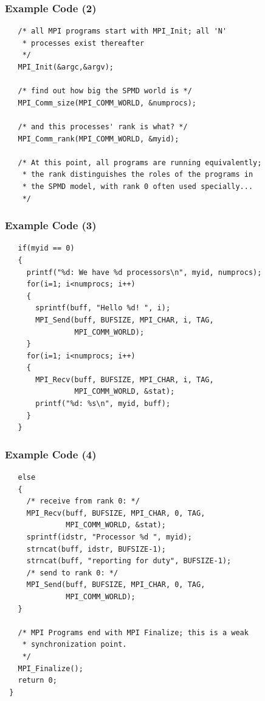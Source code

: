 \begin{frame}[fragile]
  \frametitle{Example Code (2)}
  

  \begin{lstlisting}
   /* all MPI programs start with MPI_Init; all 'N'
    * processes exist thereafter
    */
   MPI_Init(&argc,&argv); 

   /* find out how big the SPMD world is */
   MPI_Comm_size(MPI_COMM_WORLD, &numprocs);

   /* and this processes' rank is what? */
   MPI_Comm_rank(MPI_COMM_WORLD, &myid);
 
   /* At this point, all programs are running equivalently;
    * the rank distinguishes the roles of the programs in
    * the SPMD model, with rank 0 often used specially...
    */
  \end{lstlisting}
  
\end{frame}

\begin{frame}[fragile]
  \frametitle{Example Code (3)}
  

  \begin{lstlisting}
   if(myid == 0)
   {
     printf("%d: We have %d processors\n", myid, numprocs);
     for(i=1; i<numprocs; i++)
     {
       sprintf(buff, "Hello %d! ", i);
       MPI_Send(buff, BUFSIZE, MPI_CHAR, i, TAG,
                MPI_COMM_WORLD);
     }
     for(i=1; i<numprocs; i++)
     {
       MPI_Recv(buff, BUFSIZE, MPI_CHAR, i, TAG,
                MPI_COMM_WORLD, &stat);
       printf("%d: %s\n", myid, buff);
     }
   }
  \end{lstlisting}
  
\end{frame}

\begin{frame}[fragile]
  \frametitle{Example Code (4)}
  

  \begin{lstlisting}
   else
   {
     /* receive from rank 0: */
     MPI_Recv(buff, BUFSIZE, MPI_CHAR, 0, TAG,
              MPI_COMM_WORLD, &stat);
     sprintf(idstr, "Processor %d ", myid);
     strncat(buff, idstr, BUFSIZE-1);
     strncat(buff, "reporting for duty", BUFSIZE-1);
     /* send to rank 0: */
     MPI_Send(buff, BUFSIZE, MPI_CHAR, 0, TAG,
              MPI_COMM_WORLD);
   }
 
   /* MPI Programs end with MPI Finalize; this is a weak
    * synchronization point.
    */
   MPI_Finalize();
   return 0;
 }
  \end{lstlisting}
  
\end{frame}


